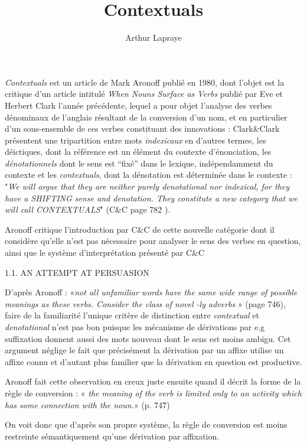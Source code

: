 \documentclass[a4paper,12pt]{article}
\author{Arthur Lapraye}
\title{Contextuals}
\begin{document}
 
 \maketitle
 

 \textit{Contextuals} est un article de Mark Aronoff publié en 1980, dont l'objet est la critique d'un article intitulé \textit{When Nouns Surface as Verbs} publié par Eve et Herbert Clark l'année précédente, lequel a pour objet l'analyse des verbes dénominaux
 de l'anglais résultant de la conversion d'un nom, et en particulier d'un sous-ensemble de ces verbes constituant des innovations :
 Clark\&Clark présentent une tripartition entre mots \textit{indexicaux} en d'autres termes, les déictiques, dont la référence est un élément du contexte d'énonciation, les \textit{dénotationnels} dont le sens est ``fixé'' dans le lexique, 
 indépendamment du contexte et les \textit{contextuals}, dont la dénotation est déterminée dans le contexte :
 "\textit{We will argue that they are neither purely denotational nor indexical, for they have a SHIFTING sense and denotation. They constitute a new category that we will call CONTEXTUALS}" (C\&C page 782 ).
	
 Aronoff critique l'introduction par C\&C de cette nouvelle catégorie dont il considère qu'elle n'est pas nécessaire pour analyser le sens des verbes en question, ainsi que le système d'interprétation présenté par C\&C
 
 1.1. AN ATTEMPT AT PERSUASION
 
 
D'après Aronoff : 
«\textit{not all unfamiliar words have the same wide range of possible meanings as these
verbs. Consider the class of novel -ly adverbs} » (page 746), faire de la familiarité l'unique critère de distinction entre \textit{contextual} et \textit{denotational} 
n'est pas bon puisque les mécanisme de dérivations par e.g suffixation donnent aussi des mots nouveau dont le sens est moins ambigu. 
Cet argument néglige le fait que précisément la dérivation par un affixe utilise un affixe connu 
et d'autant plus familier que la dérivation en question est productive.



Aronoff fait cette observation en creux juste ensuite quand il décrit la forme de la règle de conversion : 
« \textit{the meaning of the verb is limited only to an activity which has some connection with the noun.}» (p. 747) 

On voit donc que d'après son propre système, la règle de conversion est moins restreinte sémantiquement qu'une dérivation par affixation. 
\end{document}
